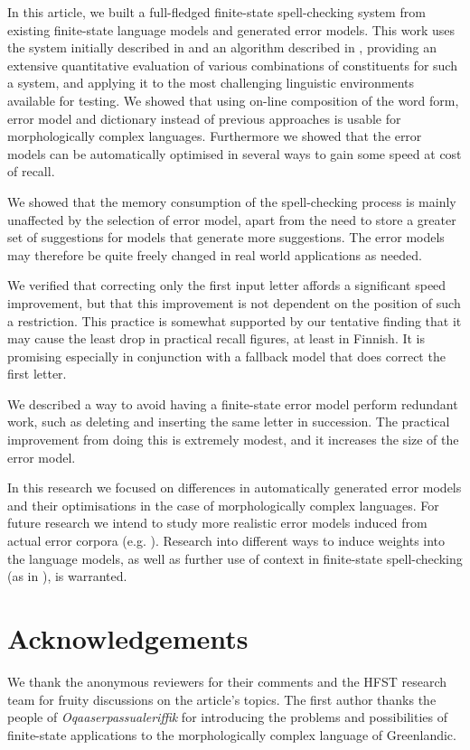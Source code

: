 \documentclass[11pt]{article}
\begin{document}
In this article, we built a full-fledged finite-state spell-checking system from
existing finite-state language models and generated error models. This work
uses the system initially described in  and an
algorithm described in , providing
an extensive quantitative evaluation of various combinations of constituents
for such a system, and applying it to the most challenging linguistic environments
available for testing.
We showed that using on-line composition of the word form, error model and
dictionary instead of previous approaches is usable for morphologically
complex languages. Furthermore
we showed that the error models can be automatically optimised in several ways
to gain some speed at cost of recall.

We showed that the memory consumption of the spell-checking process is mainly
unaffected by the selection of error model, apart from the need to store
a greater set of suggestions for models that generate more suggestions. The
error models may therefore be quite freely changed in real world
applications as needed.

We verified that correcting only the first input letter affords a significant
speed improvement, but that this improvement is not dependent on the position
of such a restriction. This practice is somewhat supported by our tentative
finding that it may cause the least drop in practical recall figures, at least
in Finnish. It is promising especially in conjunction with a fallback model
that does correct the first letter.

We described a way to avoid having a finite-state error model perform
redundant work, such as deleting and inserting the same letter in succession.
The practical improvement from doing this is extremely modest, and it increases
the size of the error model.

In this research we focused on differences in automatically generated error
models and their optimisations in the case of morphologically complex languages.
For future research we intend to study more realistic error models induced from
actual error corpora (e.g. ). Research into
different ways to induce weights into the language models, as well as further use
of context in finite-state spell-checking (as in
), is warranted.

\section*{Acknowledgements} 

We thank the anonymous reviewers for their comments and the HFST research
team for fruity discussions on the article's topics. The first author thanks
the  people of \emph{Oqaaserpassualeriffik} for introducing the problems and 
possibilities of finite-state applications to the morphologically complex
language of Greenlandic.



\end{document}
